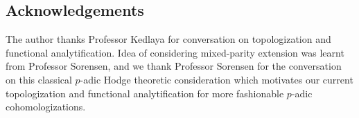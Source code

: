 \documentclass[12pt]{book}
\begin{document}
\newpage

\subsection*{Acknowledgements} 

The author thanks Professor Kedlaya for conversation on topologization and functional analytification. Idea of considering mixed-parity extension was learnt from Professor Sorensen, and we thank Professor Sorensen for the conversation on this classical $p$-adic Hodge theoretic consideration which motivates our current topologization and functional analytification for more fashionable $p$-adic cohomologizations.
\end{document}
